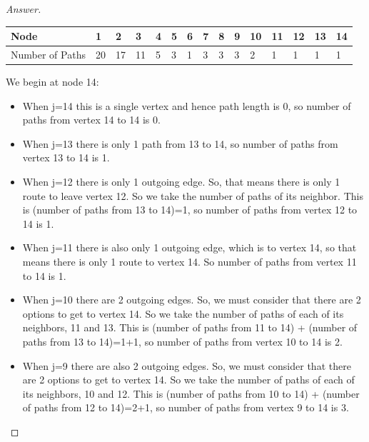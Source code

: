 \documentclass[11pt]{article}
\theoremstyle{definition}
\theoremstyle{definition}
\theoremstyle{definition}
\begin{document}
\begin{proof}[Answer]

\centering
\begin{tabular}{|l|l|l|l|l|l|l|l|l|l|l|l|l|l|l|} 
\hline
\rowcolor[rgb]{0.753,0.753,0.753} Node              & 1  & 2  & 3  & 4 & 5 & 6 & 7 & 8 & 9 & 10 & 11 & 12 & 13 & 14  \\ 
\hline
{\cellcolor[rgb]{0.753,0.753,0.753}}Number of Paths & 20 & 17 & 11 & 5 & 3 & 1 & 3 & 3 & 3 & 2  & 1  & 1  & 1  & 1   \\
\hline
\end{tabular}

We begin at node 14:
\begin{itemize}
\item When j=14 this is a single vertex and hence path length is 0, so number of paths from vertex 14 to 14 is 0.
\item When j=13 there is only 1 path from 13 to 14, so number of paths from vertex 13 to 14 is 1.
\item When j=12 there is only 1 outgoing edge. So, that means there is only 1 route to leave vertex 12. So we take the number of paths of its neighbor. This is (number of paths from 13 to 14)=1, so number of paths from vertex 12 to 14 is 1.
\item When j=11 there is also only 1 outgoing edge, which is to vertex 14, so that means there is only 1 route to vertex 14. So number of paths from vertex 11 to 14 is 1.
\item When j=10 there are 2 outgoing edges. So, we must consider that there are 2 options to get to vertex 14. So we take the number of paths of each of its neighbors, 11 and 13. This is (number of paths from 11 to 14) + (number of paths from 13 to 14)=1+1, so number of paths from vertex 10 to 14 is 2.
\item When j=9 there are also 2 outgoing edges. So, we must consider that there are 2 options to get to vertex 14. So we take the number of paths of each of its neighbors, 10 and 12. This is (number of paths from 10 to 14) + (number of paths from 12 to 14)=2+1, so number of paths from vertex 9 to 14 is 3.
\end{itemize}
\end{proof}




\newpage
\end{document}
